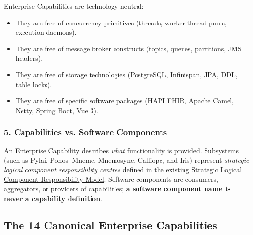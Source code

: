Enterprise Capabilities are technology-neutral:

\label{rad:enterprise:70}

\begin{itemize}

\item 
They are free of concurrency primitives (threads, worker thread pools, execution daemons).



\item 
They are free of message broker constructs (topics, queues, partitions, JMS headers).



\item 
They are free of storage technologies (PostgreSQL, Infinispan, JPA, DDL, table locks).



\item 
They are free of specific software packages (HAPI FHIR, Apache Camel, Netty, Spring Boot, Vue 3).



\end{itemize}
\label{rad:enterprise:75}
\subsubsection*{5. Capabilities vs. Software Components}
\label{rad:enterprise:76}

An Enterprise Capability describes \emph{what} functionality is provided. Subsystems (such as Pylai, Ponos, Mneme, Mnemosyne, Calliope, and Iris) represent \emph{strategic logical component responsibility centres} defined in the existing \href{https://github.com/fhirfactory/harmonia/blob/98410db60155198a75f74c79d98060070209faa1/docs/markdown/02-strategy/strategic-views/logical-component-responsibilities.md}{Strategic Logical Component Responsibility Model}. Software components are consumers, aggregators, or providers of capabilities; \textbf{a software component name is never a capability definition}.

\label{rad:enterprise:78}

\par\smallskip
{}\label{rad:enterprise:80}
\subsection*{The 14 Canonical Enterprise Capabilities}
\label{rad:enterprise:82}

